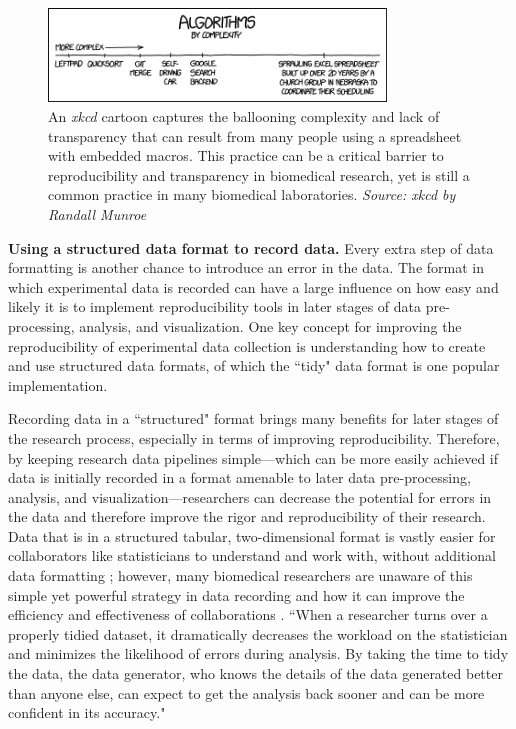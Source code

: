 \documentclass[pdftex,english,11pt,parskip=half]{scrartcl}
\begin{document}
\begin{figure}[b] \centering \includegraphics[width =
0.8\textwidth]{figures/algorithms.png} \caption{An \textit{xkcd} cartoon
captures the ballooning complexity and lack of transparency that can result from
many people using a spreadsheet with embedded macros. This practice can be a
critical barrier to reproducibility and transparency in biomedical research, yet
is still a common practice in many biomedical laboratories. \textit{Source: xkcd
by Randall Munroe}} \label{fig:spreadsheet} \end{figure}

\textbf{Using a structured data format to record data.} Every extra step of data
formatting is another chance to introduce an error in the data. The format in which experimental data is recorded can have a large influence on how easy and likely it is to implement reproducibility tools in later stages of data pre-processing, analysis, and visualization. One key concept for improving the reproducibility of experimental data collection is understanding how to create and use structured data formats, of which the ``tidy" data format is one popular implementation. 

Recording data in a ``structured" format brings many benefits for later stages of the research process, especially in terms of improving reproducibility. Therefore, by keeping research data pipelines simple---which can be more easily achieved if
data is initially recorded in a format amenable to later data pre-processing,
analysis, and visualization---researchers can decrease the potential for errors
in the data and therefore improve the rigor and reproducibility of their
research. Data that is in a structured tabular, two-dimensional format is vastly easier for collaborators like statisticians to understand and work with, without additional data formatting \cite{broman2018data}; however, many biomedical researchers are unaware of this simple yet powerful strategy in data recording and how it can improve the efficiency and effectiveness of collaborations \cite{ellis2018share}. ``When a researcher turns over a properly tidied dataset, it dramatically decreases the workload on the statistician and minimizes the likelihood of errors during analysis. By taking the time to tidy the data, the data generator, who knows the details of the data generated better than anyone else, can expect to get the analysis back sooner and can be more confident in its accuracy." \cite{ellis2018share}
\end{document}
